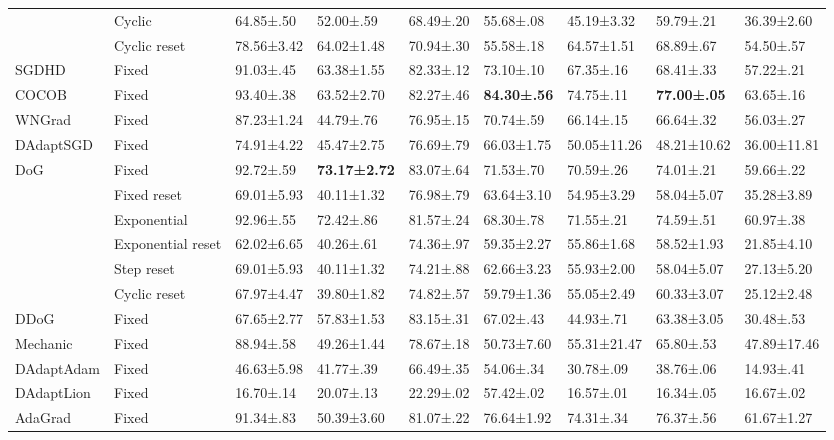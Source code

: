 \begin{tabular}{lllllllll}
 & Cyclic & 64.85±.50 & 52.00±.59 & 68.49±.20 & 55.68±.08 & 45.19±3.32 & 59.79±.21 & 36.39±2.60 \\
 & Cyclic reset & 78.56±3.42 & 64.02±1.48 & 70.94±.30 & 55.58±.18 & 64.57±1.51 & 68.89±.67 & 54.50±.57 \\
SGDHD & Fixed & 91.03±.45 & 63.38±1.55 & 82.33±.12 & 73.10±.10 & 67.35±.16 & 68.41±.33 & 57.22±.21 \\
COCOB & Fixed & 93.40±.38 & 63.52±2.70 & 82.27±.46 & \bfseries 84.30±.56 & 74.75±.11 & \bfseries 77.00±.05 & 63.65±.16 \\
WNGrad & Fixed & 87.23±1.24 & 44.79±.76 & 76.95±.15 & 70.74±.59 & 66.14±.15 & 66.64±.32 & 56.03±.27 \\
DAdaptSGD & Fixed & 74.91±4.22 & 45.47±2.75 & 76.69±.79 & 66.03±1.75 & 50.05±11.26 & 48.21±10.62 & 36.00±11.81 \\
\multirow[c]{6}{*}{DoG} & Fixed & 92.72±.59 & \bfseries 73.17±2.72 & 83.07±.64 & 71.53±.70 & 70.59±.26 & 74.01±.21 & 59.66±.22 \\
 & Fixed reset & 69.01±5.93 & 40.11±1.32 & 76.98±.79 & 63.64±3.10 & 54.95±3.29 & 58.04±5.07 & 35.28±3.89 \\
 & Exponential & 92.96±.55 & 72.42±.86 & 81.57±.24 & 68.30±.78 & 71.55±.21 & 74.59±.51 & 60.97±.38 \\
 & Exponential reset & 62.02±6.65 & 40.26±.61 & 74.36±.97 & 59.35±2.27 & 55.86±1.68 & 58.52±1.93 & 21.85±4.10 \\
 & Step reset & 69.01±5.93 & 40.11±1.32 & 74.21±.88 & 62.66±3.23 & 55.93±2.00 & 58.04±5.07 & 27.13±5.20 \\
 & Cyclic reset & 67.97±4.47 & 39.80±1.82 & 74.82±.57 & 59.79±1.36 & 55.05±2.49 & 60.33±3.07 & 25.12±2.48 \\
DDoG & Fixed & 67.65±2.77 & 57.83±1.53 & 83.15±.31 & 67.02±.43 & 44.93±.71 & 63.38±3.05 & 30.48±.53 \\
Mechanic & Fixed & 88.94±.58 & 49.26±1.44 & 78.67±.18 & 50.73±7.60 & 55.31±21.47 & 65.80±.53 & 47.89±17.46 \\
DAdaptAdam & Fixed & 46.63±5.98 & 41.77±.39 & 66.49±.35 & 54.06±.34 & 30.78±.09 & 38.76±.06 & 14.93±.41 \\
DAdaptLion & Fixed & 16.70±.14 & 20.07±.13 & 22.29±.02 & 57.42±.02 & 16.57±.01 & 16.34±.05 & 16.67±.02 \\
AdaGrad & Fixed & 91.34±.83 & 50.39±3.60 & 81.07±.22 & 76.64±1.92 & 74.31±.34 & 76.37±.56 & 61.67±1.27 \\
\bottomrule
\end{tabular}
